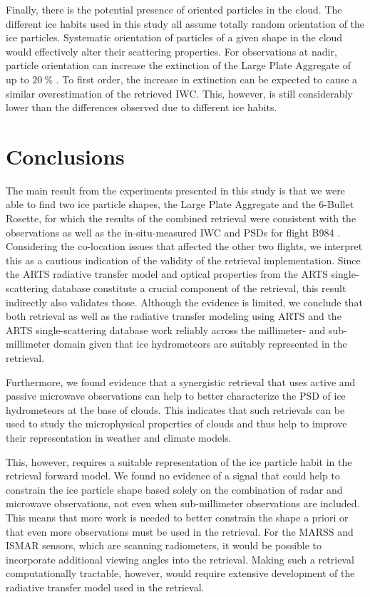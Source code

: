 \documentclass[journal abbreviation, manuscript]{copernicus}
\begin{document}
Finally, there is the potential presence of oriented particles in the cloud. The
different ice habits used in this study all assume totally random orientation of
the ice particles. Systematic orientation of particles of a given shape in the
cloud would effectively alter their scattering properties. For observations at
nadir, particle orientation can increase the extinction of the Large Plate
Aggregate of up to $20\ \unit{\%}$ \citep{barlakas21}. To first order, the
increase in extinction can be expected to cause a similar overestimation of the
retrieved IWC. This, however, is still considerably lower than the differences
observed due to different ice habits.

\section{Conclusions}
\label{sec:conclusions}

The main result from the experiments presented in this study is that we were
able to find two ice particle shapes, the Large Plate Aggregate and the 6-Bullet
Rosette, for which the results of the combined retrieval were consistent with
the observations as well as the in-situ-measured IWC and PSDs for flight B984 .
Considering the co-location issues that affected the other two flights, we
interpret this as a cautious indication of the validity of the retrieval
implementation. Since the ARTS radiative transfer model and optical properties
from the ARTS single-scattering database constitute a crucial component of the
retrieval, this result indirectly also validates those. Although the evidence is
limited, we conclude that both retrieval as well as the radiative
transfer modeling using ARTS and the ARTS single-scattering database work
reliably across the millimeter- and sub-millimeter domain given that ice
hydrometeors are suitably represented in the retrieval.

Furthermore, we found evidence that a synergistic retrieval that uses active and
passive microwave observations can help to better characterize the PSD of ice
hydrometeors at the base of clouds. This indicates that such retrievals can be
used to study the microphysical properties of clouds and thus help to improve
their representation in weather and climate models.


This, however, requires a suitable representation of the ice particle habit in
the retrieval forward model. We found no evidence of a signal that could help to
constrain the ice particle shape based solely on the combination of radar and
microwave observations, not even when sub-millimeter observations are included.
This means that more work is needed to better constrain the shape a priori or
that even more observations must be used in the retrieval. For the MARSS and
ISMAR sensors, which are scanning radiometers, it would be possible to
incorporate additional viewing angles into the retrieval. Making such a
retrieval computationally tractable, however, would require extensive
development of the radiative transfer model used in the retrieval.
\end{document}
